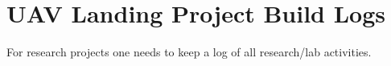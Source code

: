 
\chapter{UAV Landing Project Build Logs}

For research projects one needs to keep a log of all research/lab activities.   


\newpage

\newpage

\newpage

\newpage

\newpage
